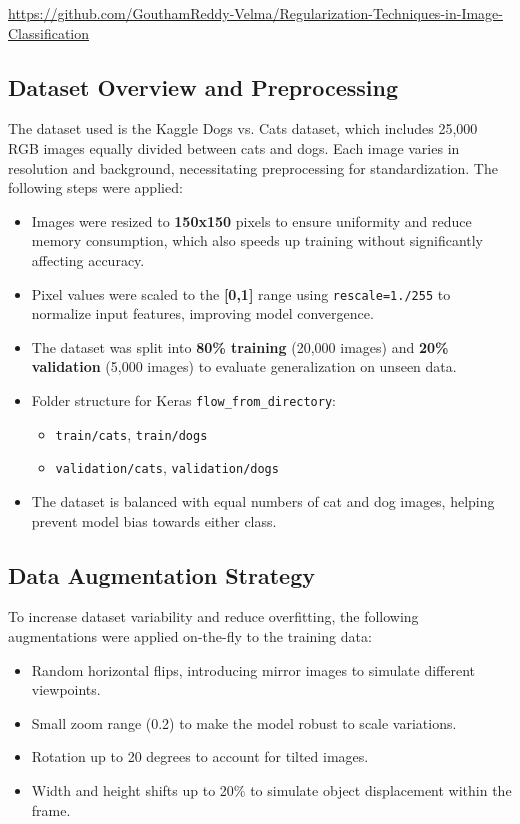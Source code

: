 \documentclass{article}
\begin{document}
\url{https://github.com/GouthamReddy-Velma/Regularization-Techniques-in-Image-Classification}

\subsection{Dataset Overview and Preprocessing}
The dataset used is the Kaggle Dogs vs. Cats dataset, which includes 25,000 RGB images equally divided between cats and dogs. Each image varies in resolution and background, necessitating preprocessing for standardization. The following steps were applied:

\begin{itemize}
    \item Images were resized to \textbf{150x150} pixels to ensure uniformity and reduce memory consumption, which also speeds up training without significantly affecting accuracy.
    \item Pixel values were scaled to the \textbf{[0,1]} range using \texttt{rescale=1./255} to normalize input features, improving model convergence.
    \item The dataset was split into \textbf{80\% training} (20,000 images) and \textbf{20\% validation} (5,000 images) to evaluate generalization on unseen data.
    \item Folder structure for Keras \texttt{flow\_from\_directory}:
    \begin{itemize}
        \item \texttt{train/cats}, \texttt{train/dogs}
        \item \texttt{validation/cats}, \texttt{validation/dogs}
    \end{itemize}
    \item The dataset is balanced with equal numbers of cat and dog images, helping prevent model bias towards either class.
\end{itemize}

\subsection{Data Augmentation Strategy}
To increase dataset variability and reduce overfitting, the following augmentations were applied on-the-fly to the training data:

\begin{itemize}
    \item Random horizontal flips, introducing mirror images to simulate different viewpoints.
    \item Small zoom range (0.2) to make the model robust to scale variations.
    \item Rotation up to 20 degrees to account for tilted images.
    \item Width and height shifts up to 20\% to simulate object displacement within the frame.
\end{itemize}
\end{document}
